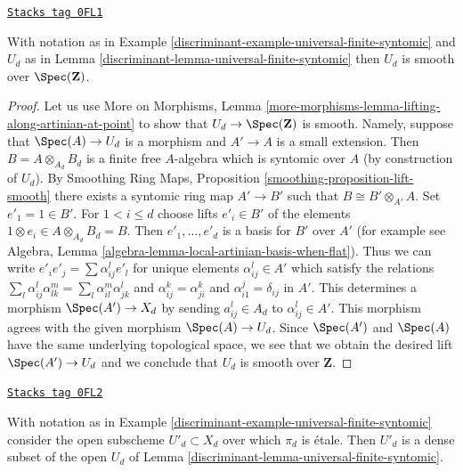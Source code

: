 \begin{lemma}
\label{discriminant-lemma-universal-finite-syntomic-smooth}
\href{https://stacks.math.columbia.edu/tag/0FL1}{\texttt{Stacks tag 0FL1}}

With notation as in Example \ref{discriminant-example-universal-finite-syntomic}
and $U_d$ as in Lemma \ref{discriminant-lemma-universal-finite-syntomic}
then $U_d$ is smooth over $\Spec(\mathbf{Z})$.
\end{lemma}

\begin{proof}
Let us use More on Morphisms, Lemma
\ref{more-morphisms-lemma-lifting-along-artinian-at-point}
to show that $U_d \to \Spec(\mathbf{Z})$ is smooth.
Namely, suppose that $\Spec(A) \to U_d$ is a morphism
and $A' \to A$ is a small extension. Then $B = A \otimes_{A_d} B_d$
is a finite free $A$-algebra which is syntomic over $A$
(by construction of $U_d$). By
Smoothing Ring Maps, Proposition \ref{smoothing-proposition-lift-smooth}
there exists a syntomic ring map $A' \to B'$ such that
$B \cong B' \otimes_{A'} A$. Set $e'_1 = 1 \in B'$. For $1 < i \leq d$
choose lifts $e'_i \in B'$ of the elements
$1 \otimes e_i \in A \otimes_{A_d} B_d = B$. Then $e'_1, \ldots, e'_d$
is a basis for $B'$ over $A'$ (for example see Algebra, Lemma
\ref{algebra-lemma-local-artinian-basis-when-flat}).
Thus we can write $e'_i e'_j = \sum \alpha_{ij}^l e'_l$ for unique
elements $\alpha_{ij}^l \in A'$ which satisfy the relations
$\sum_l \alpha_{ij}^l \alpha_{lk}^m = \sum_l \alpha_{il}^m \alpha _{jk}^l$
and $\alpha_{ij}^k = \alpha_{ji}^k$ and $\alpha_{i1}^j = \delta_{ij}$
in $A'$. This determines a morphism $\Spec(A') \to X_d$ by
sending $a_{ij}^l \in A_d$ to $\alpha_{ij}^l \in A'$. This morphism
agrees with the given morphism $\Spec(A) \to U_d$. Since $\Spec(A')$
and $\Spec(A)$ have the same underlying topological space, we see
that we obtain the desired lift $\Spec(A') \to U_d$ and we
conclude that $U_d$ is smooth over $\mathbf{Z}$.
\end{proof}

\begin{lemma}
\label{discriminant-lemma-universal-finite-syntomic-etale}
\href{https://stacks.math.columbia.edu/tag/0FL2}{\texttt{Stacks tag 0FL2}}

With notation as in Example \ref{discriminant-example-universal-finite-syntomic}
consider the open subscheme $U'_d \subset X_d$ over which
$\pi_d$ is \'etale. Then $U'_d$ is a dense subset of the
open $U_d$ of Lemma \ref{discriminant-lemma-universal-finite-syntomic}.
\end{lemma}

